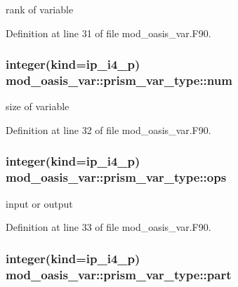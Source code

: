 rank of variable 



Definition at line 31 of file mod\+\_\+oasis\+\_\+var.\+F90.

\hypertarget{structmod__oasis__var_1_1prism__var__type_a717aa9d5848cee514dcaf036936c8f1b}{
\subsubsection[{num}]{\setlength{\rightskip}{0pt plus 5cm}integer(kind=ip\+\_\+i4\+\_\+p) mod\+\_\+oasis\+\_\+var\+::prism\+\_\+var\+\_\+type\+::num\hspace{0.3cm}{\ttfamily [private]}}}\label{structmod__oasis__var_1_1prism__var__type_a717aa9d5848cee514dcaf036936c8f1b}


size of variable 



Definition at line 32 of file mod\+\_\+oasis\+\_\+var.\+F90.

\hypertarget{structmod__oasis__var_1_1prism__var__type_a9235132dc1d3cf0b89211c09dcc62fa2}{
\subsubsection[{ops}]{\setlength{\rightskip}{0pt plus 5cm}integer(kind=ip\+\_\+i4\+\_\+p) mod\+\_\+oasis\+\_\+var\+::prism\+\_\+var\+\_\+type\+::ops\hspace{0.3cm}{\ttfamily [private]}}}\label{structmod__oasis__var_1_1prism__var__type_a9235132dc1d3cf0b89211c09dcc62fa2}


input or output 



Definition at line 33 of file mod\+\_\+oasis\+\_\+var.\+F90.

\hypertarget{structmod__oasis__var_1_1prism__var__type_a370ca8fd795e1d832bdcce52705e8f0c}{
\subsubsection[{part}]{\setlength{\rightskip}{0pt plus 5cm}integer(kind=ip\+\_\+i4\+\_\+p) mod\+\_\+oasis\+\_\+var\+::prism\+\_\+var\+\_\+type\+::part\hspace{0.3cm}{\ttfamily [private]}}}\label{structmod__oasis__var_1_1prism__var__type_a370ca8fd795e1d832bdcce52705e8f0c}



